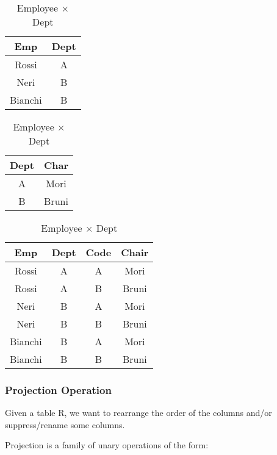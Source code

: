 \begin{table}[ht!]
    \parbox{.25\linewidth}{
    \centering
        \begin{tabular}{ |c|c| }
            \hline
                Emp & Dept \\
            \hline
            \hline
                Rossi & A \\
            \hline
                Neri & B \\
            \hline
                Bianchi & B \\
            \hline
        \end{tabular}
        \caption*{Employee}
    }
    \hfill
    \parbox{.25\linewidth}{
    \centering
        \begin{tabular}{ |c|c| }
            \hline
                Dept & Char \\
            \hline
            \hline
                A & Mori \\
            \hline
                B & Bruni \\
            \hline
        \end{tabular}
        \caption*{Dept}
    }
    \hfill
    \parbox{.40\linewidth}{
    \centering
        \begin{tabular}{ |c|c|c|c| }
            \hline
                Emp & Dept & Code & Chair \\
            \hline
            \hline
                Rossi & A & A & Mori \\
            \hline
                Rossi & A & B & Bruni \\
            \hline
                Neri & B & A & Mori \\
            \hline
                Neri & B & B & Bruni \\
            \hline
                Bianchi & B & A & Mori \\
            \hline
                Bianchi & B & B & Bruni \\
            \hline
        \end{tabular}
        \caption*{Employee $\times$ Dept}
    }
\end{table}

\subsubsection{Projection Operation}
Given a table R, we want to rearrange the order of the columns and/or suppress/rename some columns.

Projection is a family of unary operations of the form:

